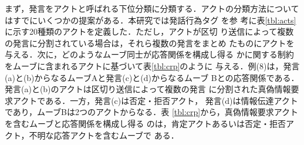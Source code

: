 まず，発言をアクトと呼ばれる下位分類に分類する．アクトの分類方法について
はすでにいくつかの提案がある．本研究では発話行為タグ\cite{Araki:99} を参
考に表\ref{tbl:acts}に示す20種類のアクトを定義した．ただし，アクトが区切
り送信によって複数の発言に分割されている場合は，それら複数の発言をまとめ
たものにアクトを与える．次に，どのようなムーブ同士が応答関係を構成し得る
かに関する制約をムーブに含まれるアクトに基づいて表\ref{tbl:crp}のように
与える．例(8)は，発言(a)と(b)からなるムーブAと発言(c)と(d)からなるムーブ
Bとの応答関係である．発言(a)と(b)のアクトは区切り送信によって複数の発言
に分割された真偽情報要求アクトである．一方，発言(c)は否定・拒否アクト，
発言(d)は情報伝達アクトであり，ムーブBは2つのアクトからなる．表
\ref{tbl:crp}から，真偽情報要求アクトを含むムーブと応答関係を構成し得る
のは，肯定アクトあるいは否定・拒否アクト，不明な応答アクトを含むムーブで
ある．


